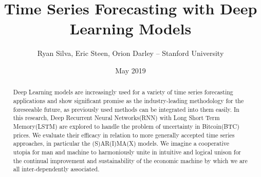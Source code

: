\documentclass{article}
\title{Time Series Forecasting with Deep Learning Models}
\author{Ryan Silva, Eric Steen, Orion Darley – Stanford University }
\date{May 2019}
\begin{document}
\maketitle

\begin{abstract}
Deep Learning models are increasingly used for a variety of time series forecasting applications and show significant promise as the industry-leading methodology for the foreseeable future, as previously used methods can be integrated into them easily. In this research, Deep Recurrent Neural Networks(RNN) with Long Short Term Memory(LSTM) are explored to handle the problem of uncertainty in Bitcoin(BTC) prices. We evaluate their efficacy in relation to more generally accepted time series approaches, in particular the (S)AR(I)MA(X) models. We imagine a cooperative utopia for man and machine to harmoniously unite in intuitive and logical unison for the continual improvement and sustainability of the economic machine by which we are all inter-dependently associated.
\end{abstract}
\end{document}
